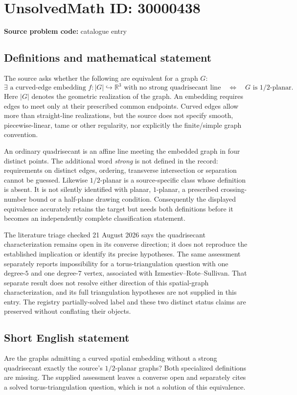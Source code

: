 \documentclass[11pt]{article}
\newcommand{\R}{\mathbb{R}}
\begin{document}
\section*{UnsolvedMath ID: 30000438}
\textbf{Source problem code:} catalogue entry
\subsection{Definitions and mathematical statement}
The source asks whether the following are equivalent for a graph $G$:
\[
 \exists\text{ a curved-edge embedding }f:|G|\hookrightarrow\R^3
       \text{ with no strong quadrisecant line}
 \quad\Longleftrightarrow\quad G\text{ is }1/2\text{-planar}.
\]
Here $|G|$ denotes the geometric realization of the graph. An embedding requires edges to meet only at their prescribed common endpoints. Curved edges allow more than straight-line realizations, but the source does not specify smooth, piecewise-linear, tame or other regularity, nor explicitly the finite/simple graph convention.

An ordinary quadrisecant is an affine line meeting the embedded graph in four distinct points. The additional word \emph{strong} is not defined in the record: requirements on distinct edges, ordering, transverse intersection or separation cannot be guessed. Likewise $1/2$-planar is a source-specific class whose definition is absent. It is not silently identified with planar, $1$-planar, a prescribed crossing-number bound or a half-plane drawing condition. Consequently the displayed equivalence accurately retains the target but needs both definitions before it becomes an independently complete classification statement.

The literature triage checked 21 August 2026 says the quadrisecant characterization remains open in its converse direction; it does not reproduce the established implication or identify its precise hypotheses. The same assessment separately reports impossibility for a torus-triangulation question with one degree-$5$ and one degree-$7$ vertex, associated with Izmestiev--Rote--Sullivan. That separate result does not resolve either direction of this spatial-graph characterization, and its full triangulation hypotheses are not supplied in this entry. The registry partially-solved label and these two distinct status claims are preserved without conflating their objects.
\subsection{Short English statement}
Are the graphs admitting a curved spatial embedding without a strong quadrisecant exactly the source's $1/2$-planar graphs? Both specialized definitions are missing. The supplied assessment leaves a converse open and separately cites a solved torus-triangulation question, which is not a solution of this equivalence.
\end{document}
